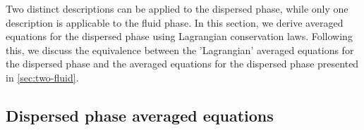 Two distinct descriptions can be applied to the dispersed phase, while only one description is applicable to the fluid phase. 
In this section, we derive averaged equations for the dispersed phase using Lagrangian conservation laws. 
Following this, we  discuss the equivalence between the 'Lagrangian' averaged equations for the dispersed phase and the averaged equations for the dispersed phase presented in \ref{sec:two-fluid}.



\subsection{Dispersed phase averaged equations}

